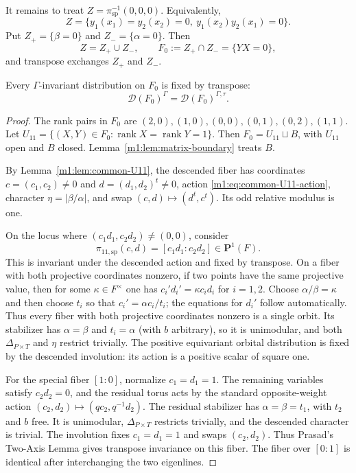 It remains to treat \(Z=\pi_{\mathrm{sp}}^{-1}(0,0,0)\). Equivalently,
\[
    Z=
    \{y_1(x_1)=y_2(x_2)=0,
      \ y_1(x_2)y_2(x_1)=0\}.
\]
Put \(Z_+=\{\beta=0\}\) and \(Z_-=\{\alpha=0\}\). Then
\[
    Z=Z_+\cup Z_-,
    \qquad
    F_0:=Z_+\cap Z_-=\{YX=0\},
\]
and transpose exchanges $Z_+$ and $Z_-$.

\begin{lemma}\label{m1:lem:split-F0}
Every $\Gamma$-invariant distribution on $F_0$ is fixed by transpose:
\[
    \mathcal D(F_0)^\Gamma=\mathcal D(F_0)^{\Gamma,\tau}.
\]
\end{lemma}

\begin{proof}
The rank pairs in $F_0$ are
\((2,0),\allowbreak(1,0),\allowbreak(0,0),\allowbreak(0,1),\allowbreak(0,2),\allowbreak(1,1)\). Let
\(U_{11}=\{(X,Y)\in F_0: \operatorname{rank}X=\operatorname{rank}Y=1\}\). Then \(F_0=U_{11}\sqcup B\),
with $U_{11}$ open and $B$ closed.  Lemma~\ref{m1:lem:matrix-boundary} treats
$B$.

By Lemma~\ref{m1:lem:common-U11}, the descended fiber has coordinates
$c=(c_1,c_2)\neq0$ and $d=(d_1,d_2)^t\neq0$, action
\eqref{m1:eq:common-U11-action}, character $\eta=|\beta/\alpha|$, and
swap $(c,d)\mapsto(d^t,c^t)$. Its odd relative modulus is one.

On the locus where \((c_1d_1,c_2d_2)\neq(0,0)\), consider
\[
    \pi_{11,\mathrm{sp}}(c,d)
    =[c_1d_1:c_2d_2]\in\mathbf P^1(F).
\]
This is invariant under the descended action and fixed by transpose.
On a fiber with both projective coordinates nonzero, if two points have
the same projective value, then for some
$\kappa\in F^\times$ one has \(c_i'd_i'=\kappa c_id_i\) for \(i=1,2\). Choose $\alpha/\beta=\kappa$ and
then choose $t_i$ so that
$c_i'=\alpha c_i/t_i$; the equations for $d_i'$ follow automatically.
Thus every fiber with both projective coordinates nonzero is a single orbit.
Its stabilizer has $\alpha=\beta$ and $t_i=\alpha$ (with $b$ arbitrary),
so it is unimodular, and both $\Delta_{P\times T}$ and $\eta$ restrict
trivially. The positive equivariant orbital distribution is fixed by the
descended involution: its action is a positive scalar of square one.

For the special fiber $[1:0]$, normalize $c_1=d_1=1$.  The remaining
variables satisfy \(c_2d_2=0\), and the residual torus acts by the standard opposite-weight action
\((c_2,d_2)\longmapsto(qc_2,q^{-1}d_2)\). The residual stabilizer has $\alpha=\beta=t_1$, with $t_2$
and $b$
free. It is unimodular, $\Delta_{P\times T}$ restricts trivially, and the
descended character is trivial. The involution fixes $c_1=d_1=1$ and
swaps $(c_2,d_2)$. Thus Prasad's
Two-Axis Lemma gives transpose invariance on this fiber.  The fiber
over $[0:1]$ is identical after interchanging the two eigenlines.


\end{proof}
